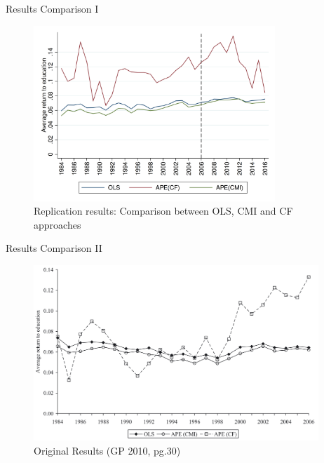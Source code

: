 \documentclass[10pt,ignorenonframetext,]{beamer}
\begin{document}
\begin{frame}{Results Comparison I}
\protect\hypertarget{results-comparison-i}{}

\begin{figure}
\centering
\includegraphics[width=\textwidth,height=2.60417in]{img/OLS_CMI_CF_Repli.png}
\caption{Replication results: Comparison between OLS, CMI and CF
approaches}
\end{figure}

\end{frame}

\begin{frame}{Results Comparison II}
\protect\hypertarget{results-comparison-ii}{}

\begin{figure}
\centering
\includegraphics[width=\textwidth,height=2.60417in]{img/OLS_CMI_CF_GB2010.png}
\caption{Original Results (GP 2010, pg.30)}
\end{figure}

\end{frame}
\end{document}
